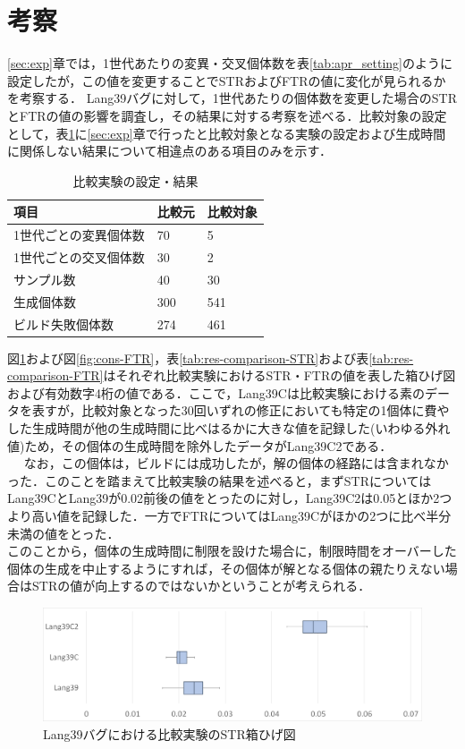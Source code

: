 \documentclass[uplatex,dvipdfmx,a4paper]{jsarticle}
\begin{document}
\section{考察}\label{sec:cons}
\ref{sec:exp}章では，1世代あたりの変異・交叉個体数を表\ref{tab:apr_setting}のように設定したが，この値を変更することでSTRおよびFTRの値に変化が見られるかを考察する．
Lang39バグに対して，1世代あたりの個体数を変更した場合のSTRとFTRの値の影響を調査し，その結果に対する考察を述べる．比較対象の設定として，表\ref{tab:comparison}に\ref{sec:exp}章で行ったと比較対象となる実験の設定および生成時間に関係しない結果について相違点のある項目のみを示す．
\begin{table}[b]
  \centering
  \caption{比較実験の設定・結果}
  \label{tab:comparison}
  \begin{tabular}{l|ll} \hline\hline
    項目 & 比較元         & 比較対象                           \\\hline
    1世代ごとの変異個体数 & 70 & 5 \\
    1世代ごとの交叉個体数 & 30 & 2 \\
    サンプル数 & 40 & 30 \\
    生成個体数 & 300 & 541 \\
    ビルド失敗個体数 & 274 & 461 \\\hline\hline
  \end{tabular}
\end{table}
図\ref{fig:cons-STR}および図\ref{fig:cons-FTR}，表\ref{tab:res-comparison-STR}および表\ref{tab:res-comparison-FTR}はそれぞれ比較実験におけるSTR・FTRの値を表した箱ひげ図および有効数字4桁の値である．ここで，Lang39Cは比較実験における素のデータを表すが，比較対象となった30回いずれの修正においても特定の1個体に費やした生成時間が他の生成時間に比べはるかに大きな値を記録した(いわゆる外れ値)ため，その個体の生成時間を除外したデータがLang39C2である．\\　
なお，この個体は，ビルドには成功したが，解の個体の経路には含まれなかった．このことを踏まえて比較実験の結果を述べると，まずSTRについてはLang39CとLang39が0.02前後の値をとったのに対し，Lang39C2は0.05とほか2つより高い値を記録した．一方でFTRについてはLang39Cがほかの2つに比べ半分未満の値をとった．\\
このことから，個体の生成時間に制限を設けた場合に，制限時間をオーバーした個体の生成を中止するようにすれば，その個体が解となる個体の親たりえない場合はSTRの値が向上するのではないかということが考えられる．
\begin{figure}[t]
  \centering
  \includegraphics[width=\linewidth]{fig/cons_STR.png}
  \caption{Lang39バグにおける比較実験のSTR箱ひげ図}
  \label{fig:cons-STR}
\end{figure}
\end{document}
